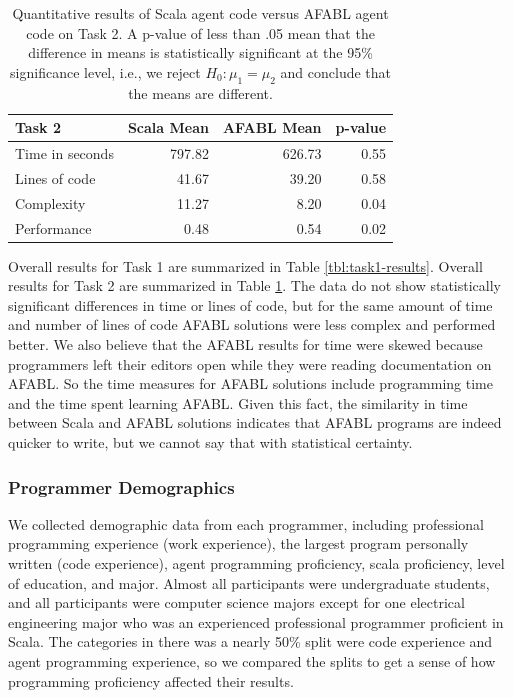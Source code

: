 \begin{center}
\begin{table}[h]
\begin{center}
\begin{tabular}{|l|r|r|r|}\hline
Task 2 & Scala Mean & AFABL Mean & p-value \\\hline
Time in seconds & 797.82 & 626.73 & 0.55\\
Lines of code & 41.67 & 39.20 & 0.58\\
Complexity & 11.27 & 8.20 & 0.04\\
Performance & 0.48 & 0.54 & 0.02\\
\hline
\end{tabular}
\end{center}
\caption{Quantitative results of Scala agent code versus AFABL agent code on Task 2. A p-value of less than .05 mean that the difference in means is statistically significant at the 95\% significance level, i.e., we reject $H_0: \mu_1 = \mu_2$ and conclude that the means are different.}
\label{tbl:task2-results}
\end{table}
\end{center}


Overall results for Task 1 are summarized in Table \ref{tbl:task1-results}. Overall results for Task 2 are summarized in Table \ref{tbl:task2-results}. The data do not show statistically significant differences in time or lines of code, but for the same amount of time and number of lines of code AFABL solutions were less complex and performed better. We also believe that the AFABL results for time were skewed because programmers left their editors open while they were reading documentation on AFABL. So the time measures for AFABL solutions include programming time and the time spent learning AFABL. Given this fact, the similarity in time between Scala and AFABL solutions indicates that AFABL programs are indeed quicker to write, but we cannot say that with statistical certainty.

\subsubsection{Programmer Demographics}

We collected demographic data from each programmer, including professional programming experience (work experience), the largest program personally written (code experience), agent programming proficiency, scala proficiency, level of education, and major. Almost all participants were undergraduate students, and all participants were computer science majors except for one electrical engineering major who was an experienced professional programmer proficient in Scala. The categories in there was a nearly 50\% split were code experience and agent programming experience, so we compared the splits to get a sense of how programming proficiency affected their results.

